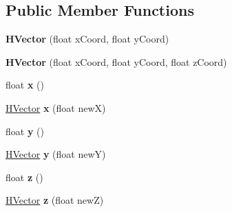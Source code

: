 \subsection*{Public Member Functions}
\begin{DoxyCompactItemize}
\item 
\hypertarget{classhype_1_1util_1_1_h_vector_a876fb3f042945cf01e83c7f11bcc29d4}{{\bfseries H\-Vector} (float x\-Coord, float y\-Coord)}\label{classhype_1_1util_1_1_h_vector_a876fb3f042945cf01e83c7f11bcc29d4}

\item 
\hypertarget{classhype_1_1util_1_1_h_vector_afe5eaa3e4277f2af8e7549eb0edf8d88}{{\bfseries H\-Vector} (float x\-Coord, float y\-Coord, float z\-Coord)}\label{classhype_1_1util_1_1_h_vector_afe5eaa3e4277f2af8e7549eb0edf8d88}

\item 
\hypertarget{classhype_1_1util_1_1_h_vector_ada4aa034ee78e6b2193de65b876688f5}{float {\bfseries x} ()}\label{classhype_1_1util_1_1_h_vector_ada4aa034ee78e6b2193de65b876688f5}

\item 
\hypertarget{classhype_1_1util_1_1_h_vector_a7c0ee8dc0c04087d7b9c2de85b82a2be}{\hyperlink{classhype_1_1util_1_1_h_vector}{H\-Vector} {\bfseries x} (float new\-X)}\label{classhype_1_1util_1_1_h_vector_a7c0ee8dc0c04087d7b9c2de85b82a2be}

\item 
\hypertarget{classhype_1_1util_1_1_h_vector_ace575b495f22952997ceaa6c171934a1}{float {\bfseries y} ()}\label{classhype_1_1util_1_1_h_vector_ace575b495f22952997ceaa6c171934a1}

\item 
\hypertarget{classhype_1_1util_1_1_h_vector_afeeb655afa147c61a1e0843fdd6b5202}{\hyperlink{classhype_1_1util_1_1_h_vector}{H\-Vector} {\bfseries y} (float new\-Y)}\label{classhype_1_1util_1_1_h_vector_afeeb655afa147c61a1e0843fdd6b5202}

\item 
\hypertarget{classhype_1_1util_1_1_h_vector_a19ed38d329935215aef5f0c93bdb1b57}{float {\bfseries z} ()}\label{classhype_1_1util_1_1_h_vector_a19ed38d329935215aef5f0c93bdb1b57}

\item 
\hypertarget{classhype_1_1util_1_1_h_vector_a2f926d05dbfa381a3add77a6c93f6385}{\hyperlink{classhype_1_1util_1_1_h_vector}{H\-Vector} {\bfseries z} (float new\-Z)}\label{classhype_1_1util_1_1_h_vector_a2f926d05dbfa381a3add77a6c93f6385}

\end{DoxyCompactItemize}
